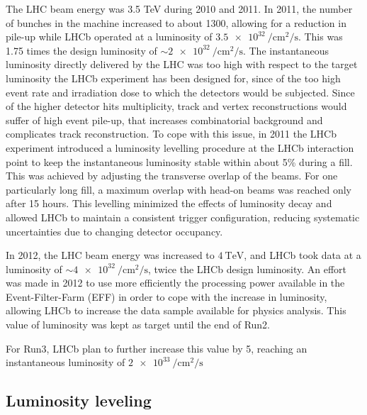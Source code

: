 The LHC beam energy was 3.5 TeV during 2010 and 2011. In 2011, the number of bunches in the machine increased to about 1300, allowing for a reduction in pile-up while LHCb operated at a luminosity of $\SI{3.5e32}{\per\centi\meter\squared\per\second}$. This was 1.75 times the design luminosity of $\sim \SI{2e32}{\per\centi\meter\squared\per\second}$. The instantaneous luminosity directly delivered by the LHC was too high with respect to the target luminosity the LHCb experiment has been designed for, since of the too high event rate and irradiation dose to which the detectors would be subjected. Since of the higher detector hits multiplicity, track and vertex reconstructions would suffer of high event pile-up, that increases combinatorial background and complicates track reconstruction.
To cope with this issue, in 2011 the LHCb experiment introduced a luminosity levelling procedure at the LHCb interaction point to keep the instantaneous luminosity stable within about 5\% during a fill. This was achieved by adjusting the transverse overlap of the beams. For one particularly long fill, a maximum overlap with head-on beams was reached only after 15 hours. This levelling minimized the effects of luminosity decay and allowed LHCb to maintain a consistent trigger configuration, reducing systematic uncertainties due to changing detector occupancy.

In 2012, the LHC beam energy was increased to $\SI{4}{\tera\eV}$, and LHCb took data at a luminosity of $\sim \SI{4e32}{\per\centi\meter\squared\per\second}$, twice the LHCb design luminosity. An effort was made in 2012 to use more efficiently the processing power available in the Event-Filter-Farm (EFF) in order to cope with the increase in luminosity, allowing LHCb to increase the data sample available for physics analysis. This value of luminosity was kept as target until the end of Run2. 


For Run3, LHCb plan to further increase this value by 5, reaching an instantaneous luminosity of $\SI{2e33}{\per\centi\meter\squared\per\second}$

\subsection{Luminosity leveling}\label{sec:lumi_levelling}

